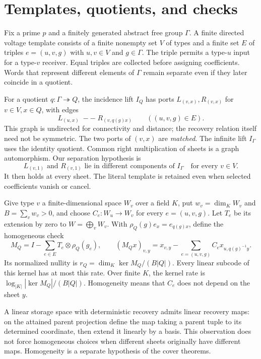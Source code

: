 \section{Templates, quotients, and checks}\label{sec:model}

Fix a prime $p$ and a finitely generated abstract free group $\Gamma$.
A finite directed voltage template consists of a finite nonempty set
$V$ of types and a finite set $E$ of triples $e=(u,v,g)$ with
$u,v\in V$ and $g\in\Gamma$. The triple permits a type-$u$ input for
a type-$v$ receiver. Equal triples are collected before assigning
coefficients. Words that represent different elements of $\Gamma$
remain separate even if they later coincide in a quotient.

For a quotient $q:\Gamma\twoheadrightarrow Q$, the incidence lift
$I_Q$ has ports $L_{(v,x)},R_{(v,x)}$ for $v\in V,x\in Q$, with edges
\begin{equation}\label{eq:lift}
 L_{(u,x)}\;--\;R_{(v,q(g)x)}\qquad ((u,v,g)\in E).
\end{equation}
This graph is undirected for connectivity and distance; the recovery
relation itself need not be symmetric. The two ports of $(v,x)$ are
\emph{matched}. The infinite lift $I_\Gamma$ uses the identity quotient.
Common right multiplication of sheets is a graph automorphism.
Our separation hypothesis is
\begin{equation}\label{eq:separation}
 L_{(v,1)}\text{ and }R_{(v,1)}\text{ lie in different components of }
 I_\Gamma\quad\text{for every }v\in V.
\end{equation}
It then holds at every sheet. The literal template is retained even
when selected coefficients vanish or cancel.

Give type $v$ a finite-dimensional space $W_v$ over a field $K$,
put $w_v=\dim_K W_v$ and $B=\sum_vw_v>0$, and choose
$C_e:W_u\to W_v$ for every $e=(u,v,g)$.
Let $T_e$ be its extension by zero to $W=\bigoplus_vW_v$.
With $\rho_Q(g)e_x=e_{q(g)x}$, define the homogeneous check
\begin{equation}\label{eq:check}
 M_Q=I-\sum_{e\in E}T_e\otimes\rho_Q(g_e),\qquad
 (M_Qx)_{v,y}=x_{v,y}-\sum_{e=(u,v,g)}C_e x_{u,q(g)^{-1}y}.
\end{equation}
Its normalized nullity is
$r_Q=\dim_K\ker M_Q/(B|Q|)$.
Every linear subcode of this kernel has at most this rate. Over finite
$K$, the kernel rate is $\log_{|K|}|\ker M_Q|/(B|Q|)$.
Homogeneity means that $C_e$ does not depend on the sheet $y$.

A linear storage space with deterministic recovery admits linear
recovery maps: on the attained parent projection define the map taking
a parent tuple to its determined coordinate, then extend it linearly
by a basis. This observation does not force homogeneous choices when
different sheets originally have different maps. Homogeneity is a
separate hypothesis of the cover theorems.


